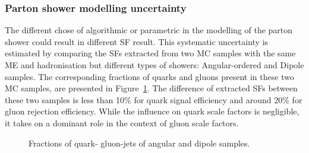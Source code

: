 \subsubsection{Parton shower modelling uncertainty}
    The different chose of algorithmic or parametric in the modelling of the parton shower could result in different SF result. This systematic uncertainty is estimated by comparing the SFs extracted from two MC samples with the same ME and hadronisation but different types of showers: \herwig Angular-ordered and \herwig Dipole samples. The corresponding fractions of quarks and gluons present in these two MC samples, are presented in Figure~\ref{fig:QG-herang-Frac}. The difference of extracted SFs between these two samples is less than 10\% for quark signal efficiency and around 20\% for gluon rejection efficiency. While the influence on quark scale factors is negligible, it takes on a dominant role in the context of gluon scale factors.
    \begin{figure}[htb]
    	\centering
    	 \quad
    	\caption[]{
    		Fractions of quark- gluon-jets of \herwig angular  and  \herwig dipole  samples.
    		\label{fig:QG-herang-Frac}
    	}
    \end{figure}

